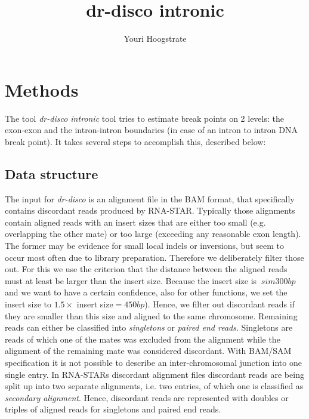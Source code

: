 \documentclass{article}
\title{dr-disco intronic}
\author[1]{Youri Hoogstrate}
\affil[1]{Department of Urology, Erasmus University Medical Center}
\theoremstyle{definition}
\begin{document}
\maketitle



\twocolumn

\section{Methods}
The tool \textit{dr-disco intronic} tool tries to estimate break points on 2 levels: the exon-exon and the intron-intron boundaries (in case of an intron to intron DNA break point). It takes several steps to accomplish this, described below:

\clearpage

\subsection{Data structure}
The input for \textit{dr-disco} is an alignment file in the BAM format, that specifically contains discordant reads produced by RNA-STAR.
Typically those alignments contain aligned reads with an insert sizes that are either too small (e.g. overlapping the other mate) or too large (exceeding any reasonable exon length).
The former may be evidence for small local indels or inversions, but seem to occur most often due to library preparation. Therefore we deliberately filter those out.
For this we use the criterion that the distance between the aligned reads must at least be larger than the insert size. Because the insert size is $~sim 300bp$ and we want to have a certain confidence, also for other functions, we set the insert size to $1.5 \times$ insert size$=450bp$). Hence, we filter out discordant reads if they are smaller than this size and aligned to the same chromosome.
Remaining reads can either be classified into \textit{singletons} or \textit{paired end reads}.
Singletons are reads of which one of the mates was excluded from the alignment while the alignment of the remaining mate was considered discordant.
With BAM/SAM specification it is not possible to describe an inter-chromosomal junction into one single entry.
In RNA-STARs discordant alignment files discordant reads are being split up into two separate alignments, i.e. two entries, of which one is classified as \textit{secondary alignment}.
Hence, discordant reads are represented with doubles or triples of aligned reads for singletons and paired end reads.
\end{document}
